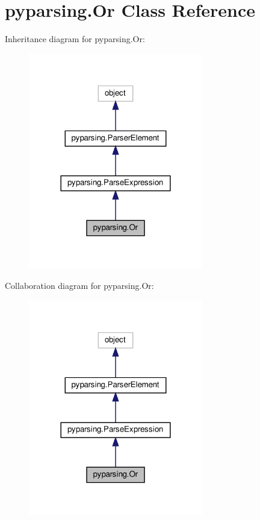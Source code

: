 \hypertarget{classpyparsing_1_1Or}{}\section{pyparsing.\+Or Class Reference}
\label{classpyparsing_1_1Or}


Inheritance diagram for pyparsing.\+Or\+:
\nopagebreak
\begin{figure}[H]
\begin{center}
\leavevmode
\includegraphics[width=216pt]{classpyparsing_1_1Or__inherit__graph}
\end{center}
\end{figure}


Collaboration diagram for pyparsing.\+Or\+:
\nopagebreak
\begin{figure}[H]
\begin{center}
\leavevmode
\includegraphics[width=216pt]{classpyparsing_1_1Or__coll__graph}
\end{center}
\end{figure}
